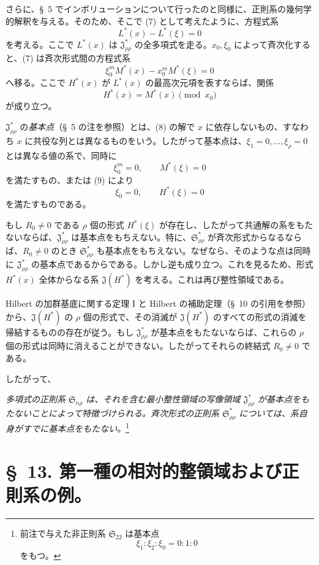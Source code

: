 \documentclass[11pt]{jlreq}
\providecommand{\Ssys}{\mathfrak{S}}
\providecommand{\Jdom}{\mathfrak{J}}
\begin{document}
さらに、\S\ 5 でインボリューションについて行ったのと同様に、正則系の幾何学的解釈を与える。そのため、そこで (7) として考えたように、方程式系
\begin{equation}
  L^*(x)-L^*(\xi)=0
\tag{7}
\end{equation}
を考える。ここで $L^*(x)$ は $\Jdom^*_{\rho\rho}$ の全多項式を走る。$x_0,\xi_0$ によって斉次化すると、(7) は斉次形式間の方程式系
\begin{equation}
  \xi_0^{m}M^*(x)-x_0^{m}M^*(\xi)=0
\tag{8}
\end{equation}
へ移る。ここで $H^*(x)$ が $L^*(x)$ の最高次元項を表すならば、関係
\begin{equation}
  H^*(x)=M^*(x)\pmod{x_0}
\tag{9}
\end{equation}
が成り立つ。

$\Jdom^*_{\rho\rho}$ の\emph{基本点}（\S\ 5 の注を参照）とは、(8) の解で $x$ に依存しないもの、すなわち $x$ に共役な列とは異なるものをいう。したがって基本点は、$\xi_1=0,\ldots,\xi_\rho=0$ とは異なる値の系で、同時に
\[
  \xi_0^m=0,
  \qquad M^*(\xi)=0
\]
を満たすもの、または (9) により
\[
  \xi_0=0,
  \qquad H^*(\xi)=0
\]
を満たすものである。

もし $R_0\ne0$ である $\rho$ 個の形式 $H^*(\xi)$ が存在し、したがって共通解の系をもたないならば、$\Jdom^*_{\rho\rho}$ は基本点をもちえない。特に、$\Ssys^*_{\rho\rho}$ が斉次形式からなるならば、$R_0\ne0$ のとき $\Ssys^*_{\rho\rho}$ も基本点をもちえない。なぜなら、そのような点は同時に $\Jdom^*_{\rho\rho}$ の基本点であるからである。しかし逆も成り立つ。これを見るため、形式 $H^*(x)$ 全体からなる系 $\Jdom(H^*)$ を考える。これは再び整性領域である。

Hilbert の加群基底に関する定理 I と Hilbert の補助定理（\S\ 10 の引用を参照）から、$\Jdom(H^*)$ の $\rho$ 個の形式で、その消滅が $\Jdom(H^*)$ のすべての形式の消滅を帰結するものの存在が従う。もし $\Jdom^*_{\rho\rho}$ が基本点をもたないならば、これらの $\rho$ 個の形式は同時に消えることができない。したがってそれらの終結式 $R_0\ne0$ である。

したがって、

\emph{多項式の正則系 $\Ssys_{n\rho}$ は、それを含む最小整性領域の写像領域 $\Jdom^*_{\rho\rho}$ が基本点をもたないことによって特徴づけられる。斉次形式の正則系 $\Ssys^*_{\rho\rho}$ については、系自身がすでに基本点をもたない。}\footnote{前注で与えた非正則系 $\Ssys_{22}$ は基本点
\[
  \xi_1:\xi_2:\xi_0=0:1:0
\]
をもつ。}

\section*{\S\ 13. 第一種の相対的整領域および正則系の例。}
\end{document}
